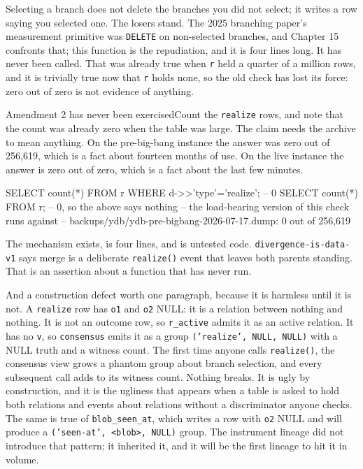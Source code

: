 Selecting a branch does not delete the branches you did not select; it writes a row saying you selected one. The losers stand. The 2025 branching paper's measurement primitive was \texttt{DELETE} on non-selected branches, and Chapter 15 confronts that; this function is the repudiation, and it is four lines long. It has never been called. That was already true when \texttt{r} held a quarter of a million rows, and it is trivially true now that \texttt{r} holds none, so the old check has lost its force: zero out of zero is not evidence of anything.

\begin{Correspondence}{Amendment 2 has never been exercised}{Count the \texttt{realize} rows, and note that the count was already zero when the table was large.}
The claim needs the archive to mean anything. On the pre-big-bang instance the answer was zero out of 256{,}619, which is a fact about fourteen months of use. On the live instance the answer is zero out of zero, which is a fact about the last few minutes.
\begin{Check}
SELECT count(*) FROM r WHERE d->>'type'='realize';  -- 0
SELECT count(*) FROM r;                             -- 0, so the above says nothing
-- the load-bearing version of this check runs against
-- backups/ydb/ydb-pre-bigbang-2026-07-17.dump: 0 out of 256,619
\end{Check}
The mechanism exists, is four lines, and is untested code. \texttt{divergence-is-data-v1} says merge is a deliberate \texttt{realize()} event that leaves both parents standing. That is an assertion about a function that has never run.
\end{Correspondence}

And a construction defect worth one paragraph, because it is harmless until it is not. A \texttt{realize} row has \texttt{o1} and \texttt{o2} NULL: it is a relation between nothing and nothing. It is not an outcome row, so \texttt{r\_active} admits it as an active relation. It has no \texttt{v}, so \texttt{consensus} emits it as a group \texttt{('realize', NULL, NULL)} with a NULL truth and a witness count. The first time anyone calls \texttt{realize()}, the consensus view grows a phantom group about branch selection, and every subsequent call adds to its witness count. Nothing breaks. It is ugly by construction, and it is the ugliness that appears when a table is asked to hold both relations and events about relations without a discriminator anyone checks. The same is true of \texttt{blob\_seen\_at}, which writes a row with \texttt{o2} NULL and will produce a \texttt{('seen-at', <blob>, NULL)} group. The instrument lineage did not introduce that pattern; it inherited it, and it will be the first lineage to hit it in volume.


